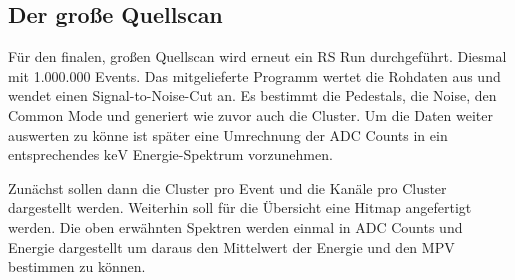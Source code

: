 \subsection{Der große Quellscan}

Für den finalen, großen Quellscan wird erneut ein RS Run durchgeführt.
Diesmal mit 1.000.000 Events.
Das mitgelieferte Programm wertet die Rohdaten aus und wendet einen Signal-to-Noise-Cut an.
Es bestimmt die Pedestals, die Noise, den Common Mode und generiert wie zuvor auch die Cluster.
Um die Daten weiter auswerten zu könne ist später eine Umrechnung der ADC Counts in ein entsprechendes $\si{\kilo\electronvolt}$ Energie-Spektrum vorzunehmen.

Zunächst sollen dann die Cluster pro Event und die Kanäle pro Cluster dargestellt werden.
Weiterhin soll für die Übersicht eine Hitmap angefertigt werden.
Die oben erwähnten Spektren werden einmal in ADC Counts und Energie dargestellt um daraus den Mittelwert der Energie und den MPV bestimmen zu können.
